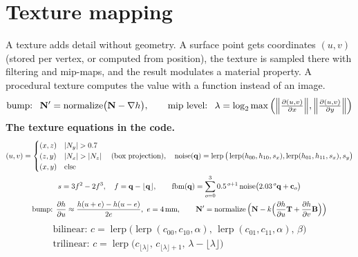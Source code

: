 \section{Texture mapping}
\label{sec:tex}
A texture adds detail without geometry. A surface point gets coordinates $(u,v)$ (stored per vertex, or
computed from position), the texture is sampled there with filtering and mip-maps, and the result modulates a
material property. A procedural texture computes the value with a function instead of an image.
\begin{equation}
\text{bump: }\ \vect N'=\mathrm{normalize}\big(\vect N-\nabla h\big),\qquad
\text{mip level: }\ \lambda=\log_2\max\Big(\Big\lVert\tfrac{\partial(u,v)}{\partial x}\Big\rVert,\Big\lVert\tfrac{\partial(u,v)}{\partial y}\Big\rVert\Big)
\label{eq:tex}
\end{equation}
\textbf{The texture equations in the code.}
\begin{gather}
(u,v)=\begin{cases}(x,z) & |N_y|>0.7\\(z,y) & |N_x|>|N_z|\\(x,y) & \text{else}\end{cases}\quad\text{(box projection)},\quad
\text{noise}(\vect q)=\operatorname{lerp}\big(\operatorname{lerp}(h_{00},h_{10},s_x),\operatorname{lerp}(h_{01},h_{11},s_x),s_y\big)\label{eq:noise}\\
s=3f^2-2f^3,\quad f=\vect q-\lfloor\vect q\rfloor,\qquad
\operatorname{fbm}(\vect q)=\sum_{o=0}^{3}0.5^{\,o+1}\,\text{noise}\big(2.03^{\,o}\vect q+\vect c_o\big)\nonumber\\
\text{bump: } \frac{\partial h}{\partial u}\approx\frac{h(u+e)-h(u-e)}{2e},\ e=4\,\text{mm},\qquad
\vect N'=\operatorname{normalize}\Big(\vect N-k\Big(\frac{\partial h}{\partial u}\vect T+\frac{\partial h}{\partial v}\vect B\Big)\Big)\nonumber
\end{gather}
\begin{gather}
\text{bilinear: } c=\operatorname{lerp}\big(\operatorname{lerp}(c_{00},c_{10},\alpha),\,\operatorname{lerp}(c_{01},c_{11},\alpha),\,\beta\big)\label{eq:filter}\\
\text{trilinear: } c=\operatorname{lerp}\big(c_{\lfloor\lambda\rfloor},\,c_{\lfloor\lambda\rfloor+1},\,\lambda-\lfloor\lambda\rfloor\big)\nonumber
\end{gather}
